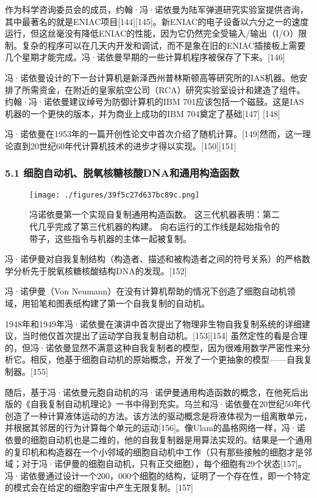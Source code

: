 作为科学咨询委员会的成员，约翰·冯·诺依曼为陆军弹道研究实验室提供咨询， 其中最著名的就是ENIAC项目[144][145]。新ENIAC的电子设备以六分之一的速度运行，但这丝毫没有降低ENIAC的性能，因为它仍然完全受输入/输出（I/O）限制。复杂的程序可以在几天内开发和调试，而不是象在旧的ENIAC插接板上需要几个星期才能完成。冯·诺依曼早期的一些计算机程序被保存了下来。[146]

冯·诺依曼设计的下一台计算机是新泽西州普林斯顿高等研究所的IAS机器。他安排了所需资金，在附近的皇家航空公司（RCA）研究实验室设计和建造了组件。约翰·冯·诺依曼建议绰号为防御计算机的IBM 701应该包括一个磁鼓。这是IAS机器的一个更快的版本，并为商业上成功的IBM 704奠定了基础[147] [148]

冯·诺依曼在1953年的一篇开创性论文中首次介绍了随机计算。[149]然而，这一理论直到20世纪60年代计算机技术的进步才得以实现。[150][151]
\subsubsection{5.1 细胞自动机、脱氧核糖核酸DNA和通用构造函数}
\begin{figure}[ht]
\centering
\texttt{[image: ./figures/39f5c27d637bc89c.png]}
\caption{冯诺依曼第一个实现自复制通用构造函数。 这三代机器表明：第二代几乎完成了第三代机器的构建。 向右运行的工作线是起始指令的带子，这些指令与机器的主体一起被复制。} \label{fig_von_9}
\end{figure}
冯·诺伊曼对自我复制结构（构造者、描述和被构造者之间的符号关系）的严格数学分析先于脱氧核糖核酸结构DNA的发现。[152]

冯·诺伊曼（Von Neumann）在没有计算机帮助的情况下创造了细胞自动机领域，用铅笔和图表纸构建了第一个自我复制的自动机。

1948年和1949年冯·诺依曼在演讲中首次提出了物理非生物自我复制系统的详细建议，当时他仅首次提出了运动学自我复制自动机。[153][154] 虽然定性的看是合理的，但冯·诺依曼显然不满意这种自我复制者的模型，因为很难用数学严密性来分析它。相反，他基于细胞自动机的原始概念，开发了一个更抽象的模型——自我复制器。[155]

随后，基于冯·诺依曼元胞自动机的冯·诺伊曼通用构造函数的概念，在他死后出版的《自我复制自动机理论》一书中得到充实。乌兰和冯·诺依曼在20世纪50年代创造了一种计算液体运动的方法。该方法的驱动概念是将液体视为一组离散单元，并根据其邻居的行为计算每个单元的运动[156]。像Ulam的晶格网络一样，冯·诺依曼的细胞自动机也是二维的，他的自我复制器是用算法实现的。结果是一个通用的复印机和构造器在一个小邻域的细胞自动机中工作（只有那些接触的细胞才是邻域；对于冯·诺伊曼的细胞自动机，只有正交细胞），每个细胞有29个状态[157]。冯·诺依曼通过设计一个200，000个细胞的结构，证明了一个存在性，即一个特定的模式会在给定的细胞宇宙中产生无限复制。[157]

